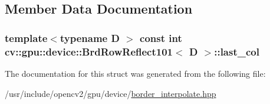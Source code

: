 \subsection{Member Data Documentation}
\hypertarget{structcv_1_1gpu_1_1device_1_1BrdRowReflect101_ac23b2ff877ab27e060f673fca28eb0d3}{
\subsubsection[{last\-\_\-col}]{\setlength{\rightskip}{0pt plus 5cm}template$<$typename D $>$ const int {\bf cv\-::gpu\-::device\-::\-Brd\-Row\-Reflect101}$<$ D $>$\-::last\-\_\-col}}\label{structcv_1_1gpu_1_1device_1_1BrdRowReflect101_ac23b2ff877ab27e060f673fca28eb0d3}


The documentation for this struct was generated from the following file\-:\begin{DoxyCompactItemize}
\item 
/usr/include/opencv2/gpu/device/\hyperlink{border__interpolate_8hpp}{border\-\_\-interpolate.\-hpp}\end{DoxyCompactItemize}
